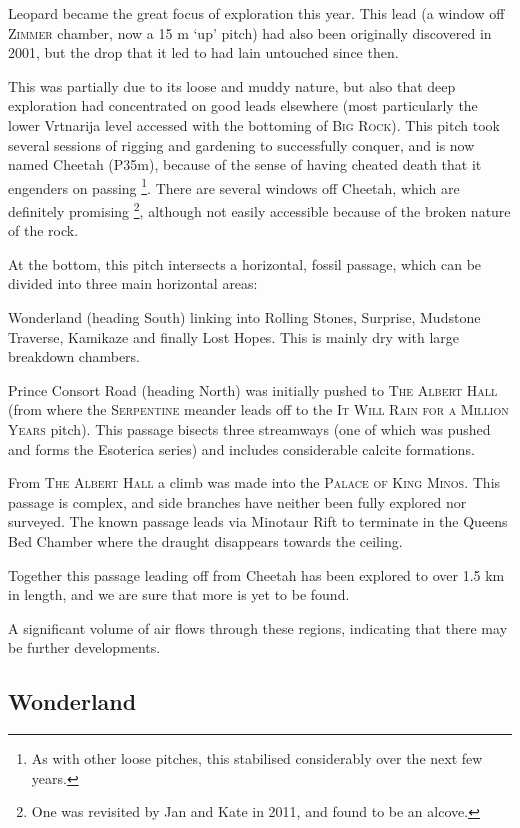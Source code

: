 Leopard became the great focus of exploration this year. This lead (a
window off \textsc{Zimmer} chamber, now a 15 m `up' pitch) had also been
originally discovered in 2001, but the drop that it led to had lain
untouched since then.

This was partially due to its loose and muddy nature, but also that deep
exploration had concentrated on good leads elsewhere (most particularly
the lower Vrtnarija level accessed with the bottoming of
\textsc{Big Rock}). This pitch took several sessions of rigging and
gardening to successfully conquer, and is now named Cheetah (P35m),
because of the sense of having cheated death that it engenders on
passing
\footnote{As with other loose pitches, this stabilised considerably over
the next few years.}. There are several windows off Cheetah, which are
definitely promising
\footnote{One was revisited by Jan and Kate in 2011, and found to be an alcove.},
although not easily accessible because of the broken nature of the rock.

At the bottom, this pitch intersects a horizontal, fossil passage, which
can be divided into three main horizontal areas:

Wonderland (heading South) linking into Rolling Stones, Surprise,
Mudstone Traverse, Kamikaze and finally Lost Hopes. This is mainly dry
with large breakdown chambers.

Prince Consort Road (heading North) was initially pushed to
\textsc{The Albert
Hall} (from where the \textsc{Serpentine} meander leads off to the
\textsc{It
Will Rain for a Million Years} pitch). This passage bisects three
streamways (one of which was pushed and forms the Esoterica series) and
includes considerable calcite formations.

From \textsc{The Albert Hall} a climb was made into the
\textsc{Palace of King Minos}. This passage is complex, and side
branches have neither been fully explored nor surveyed. The known
passage leads via Minotaur Rift to terminate in the Queens Bed Chamber
where the draught disappears towards the ceiling.

Together this passage leading off from Cheetah has been explored to over
1.5 km in length, and we are sure that more is yet to be found.

A significant volume of air flows through these regions, indicating that
there may be further developments.

\subsection{Wonderland}\label{wonderland}

